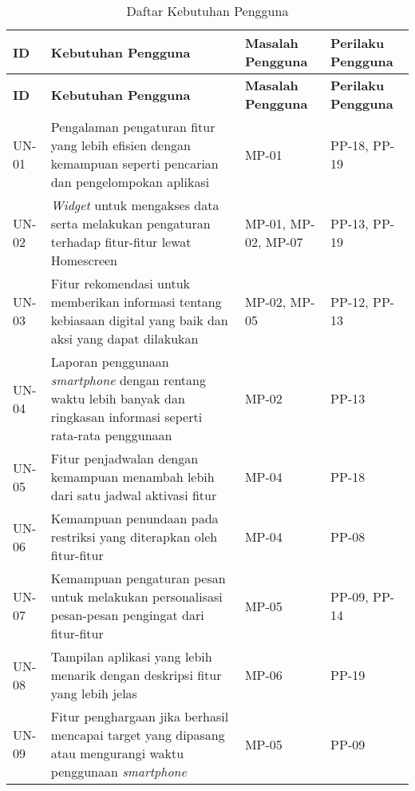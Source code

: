 
\RaggedLeft
\begin{footnotesize}
\begin{longtable}[c]{|W{c}{0.07\textwidth}|>{\ccnormspacing}m{0.55\textwidth}|>{\ccnormspacingcenter}m{0.125\textwidth}|>{\ccnormspacingcenter}m{0.125\textwidth}|}
  \caption{Daftar Kebutuhan Pengguna}
  \label{tab:daftar_kebutuhan} \\
  \hline {}
  \textbf{ID} & \centering\textbf{Kebutuhan Pengguna} & \textbf{Masalah Pengguna} & \textbf{Perilaku Pengguna} \\ \hline \endfirsthead
  \hline {}
  \textbf{ID} & \centering\textbf{Kebutuhan Pengguna} & \textbf{Masalah Pengguna} & \textbf{Perilaku Pengguna} \\ \hline \endhead

  \hline \endfoot

  UN-01  & Pengalaman pengaturan fitur yang lebih efisien dengan kemampuan seperti pencarian dan pengelompokan aplikasi & MP-01 & PP-18, PP-19 \\ \hline
  UN-02  & \textit{Widget} untuk mengakses data serta melakukan pengaturan terhadap fitur-fitur lewat Homescreen & MP-01, MP-02, MP-07 & PP-13, PP-19 \\ \hline
  UN-03  & Fitur rekomendasi untuk memberikan informasi tentang kebiasaan digital yang baik dan aksi yang dapat dilakukan & MP-02, MP-05 & PP-12, PP-13 \\ \hline
  UN-04  & Laporan penggunaan \textit{smartphone} dengan rentang waktu lebih banyak dan ringkasan informasi seperti rata-rata penggunaan & MP-02 & PP-13 \\ \hline
  UN-05  & Fitur penjadwalan dengan kemampuan menambah lebih dari satu jadwal aktivasi fitur & MP-04 & PP-18  \\ \hline
  UN-06  & Kemampuan penundaan pada restriksi yang diterapkan oleh fitur-fitur & MP-04 & PP-08 \\ \hline
  UN-07  & Kemampuan pengaturan pesan untuk melakukan personalisasi pesan-pesan pengingat dari fitur-fitur & MP-05 & PP-09, PP-14 \\ \hline
  UN-08  & Tampilan aplikasi yang lebih menarik dengan deskripsi fitur yang lebih jelas & MP-06 & PP-19 \\ \hline
  UN-09  & Fitur penghargaan jika berhasil mencapai target yang dipasang atau mengurangi waktu penggunaan \textit{smartphone} & MP-05 & PP-09 \\ \hline
\end{longtable}
\end{footnotesize}
\justifying
\FloatBarrier


